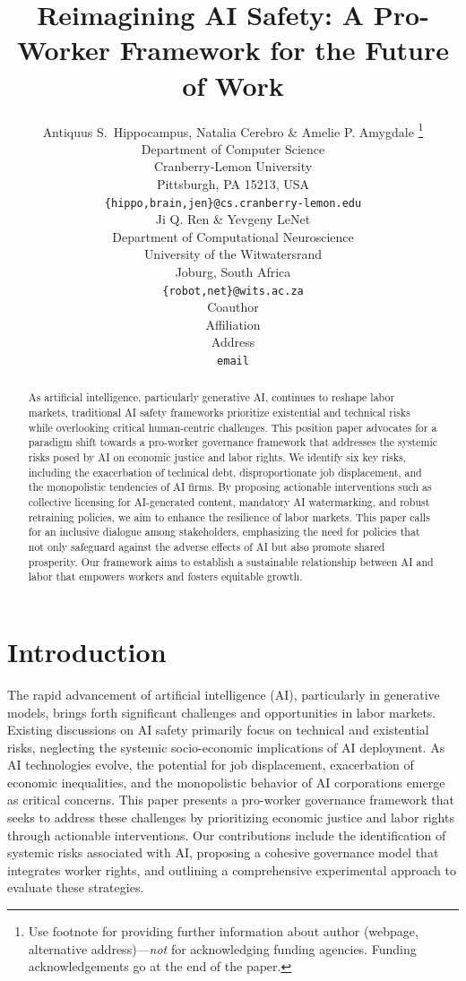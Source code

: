 \documentclass{article} %
\title{Reimagining AI Safety: A Pro-Worker Framework for the Future of Work}
\author{Antiquus S.~Hippocampus, Natalia Cerebro \& Amelie P. Amygdale \thanks{ Use footnote for providing further information
about author (webpage, alternative address)---\emph{not} for acknowledging
funding agencies.  Funding acknowledgements go at the end of the paper.} \\
Department of Computer Science\\
Cranberry-Lemon University\\
Pittsburgh, PA 15213, USA \\
\texttt{\{hippo,brain,jen\}@cs.cranberry-lemon.edu} \\
\And
Ji Q. Ren \& Yevgeny LeNet \\
Department of Computational Neuroscience \\
University of the Witwatersrand \\
Joburg, South Africa \\
\texttt{\{robot,net\}@wits.ac.za} \\
\AND
Coauthor \\
Affiliation \\
Address \\
\texttt{email}
}
\begin{document}
\maketitle
\begin{abstract}
As artificial intelligence, particularly generative AI, continues to reshape labor markets, traditional AI safety frameworks prioritize existential and technical risks while overlooking critical human-centric challenges. This position paper advocates for a paradigm shift towards a pro-worker governance framework that addresses the systemic risks posed by AI on economic justice and labor rights. We identify six key risks, including the exacerbation of technical debt, disproportionate job displacement, and the monopolistic tendencies of AI firms. By proposing actionable interventions such as collective licensing for AI-generated content, mandatory AI watermarking, and robust retraining policies, we aim to enhance the resilience of labor markets. This paper calls for an inclusive dialogue among stakeholders, emphasizing the need for policies that not only safeguard against the adverse effects of AI but also promote shared prosperity. Our framework aims to establish a sustainable relationship between AI and labor that empowers workers and fosters equitable growth.
\end{abstract}

\section{Introduction}
The rapid advancement of artificial intelligence (AI), particularly in generative models, brings forth significant challenges and opportunities in labor markets. Existing discussions on AI safety primarily focus on technical and existential risks, neglecting the systemic socio-economic implications of AI deployment. As AI technologies evolve, the potential for job displacement, exacerbation of economic inequalities, and the monopolistic behavior of AI corporations emerge as critical concerns. This paper presents a pro-worker governance framework that seeks to address these challenges by prioritizing economic justice and labor rights through actionable interventions. Our contributions include the identification of systemic risks associated with AI, proposing a cohesive governance model that integrates worker rights, and outlining a comprehensive experimental approach to evaluate these strategies.
\end{document}
